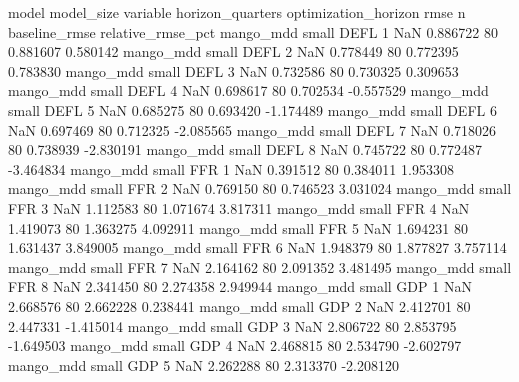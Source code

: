             model model_size variable  horizon_quarters optimization_horizon     rmse  n  baseline_rmse  relative_rmse_pct
        mango_mdd      small     DEFL                 1                  NaN 0.886722 80       0.881607           0.580142
        mango_mdd      small     DEFL                 2                  NaN 0.778449 80       0.772395           0.783830
        mango_mdd      small     DEFL                 3                  NaN 0.732586 80       0.730325           0.309653
        mango_mdd      small     DEFL                 4                  NaN 0.698617 80       0.702534          -0.557529
        mango_mdd      small     DEFL                 5                  NaN 0.685275 80       0.693420          -1.174489
        mango_mdd      small     DEFL                 6                  NaN 0.697469 80       0.712325          -2.085565
        mango_mdd      small     DEFL                 7                  NaN 0.718026 80       0.738939          -2.830191
        mango_mdd      small     DEFL                 8                  NaN 0.745722 80       0.772487          -3.464834
        mango_mdd      small      FFR                 1                  NaN 0.391512 80       0.384011           1.953308
        mango_mdd      small      FFR                 2                  NaN 0.769150 80       0.746523           3.031024
        mango_mdd      small      FFR                 3                  NaN 1.112583 80       1.071674           3.817311
        mango_mdd      small      FFR                 4                  NaN 1.419073 80       1.363275           4.092911
        mango_mdd      small      FFR                 5                  NaN 1.694231 80       1.631437           3.849005
        mango_mdd      small      FFR                 6                  NaN 1.948379 80       1.877827           3.757114
        mango_mdd      small      FFR                 7                  NaN 2.164162 80       2.091352           3.481495
        mango_mdd      small      FFR                 8                  NaN 2.341450 80       2.274358           2.949944
        mango_mdd      small      GDP                 1                  NaN 2.668576 80       2.662228           0.238441
        mango_mdd      small      GDP                 2                  NaN 2.412701 80       2.447331          -1.415014
        mango_mdd      small      GDP                 3                  NaN 2.806722 80       2.853795          -1.649503
        mango_mdd      small      GDP                 4                  NaN 2.468815 80       2.534790          -2.602797
        mango_mdd      small      GDP                 5                  NaN 2.262288 80       2.313370          -2.208120
